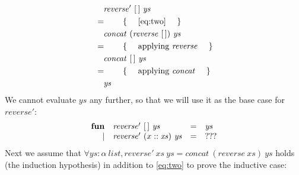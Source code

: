 \documentclass[10pt,a4paper,fleqn]{exam}
\begin{document}
\begin{questions}
\begin{parts}
\begin{align*}
\expr{\mathit{reverse}'~\hslist{}~\mathit{ys}}
\hint{\autoref{eq:two}}
\expr{\mathit{concat}~(\mathit{reverse}~\hslist{})~\mathit{ys}}
\hint{applying $\mathit{reverse}$}
\expr{\mathit{concat}~\hslist{}~\mathit{ys}}
\hint{applying $\mathit{concat}$}
\lastexpr{\mathit{ys}}
\end{align*}
We cannot evaluate $\mathit{ys}$ any further, so that we will use it as the base case for $\mathit{reverse}'$:
\begin{displaymath}
\begin{array}{rlcl}
\mathbf{fun} & \mathit{reverse}'~\hslist{}~\mathit{ys} & = & \mathit{ys} \\
    \mid & \mathit{reverse}'~(x :: \mathit{xs})~\mathit{ys} & = & ???
\end{array}
\end{displaymath}
Next we assume that $\forall ys : \alpha~\mathit{list}, \mathit{reverse}'~\mathit{xs}~\mathit{ys} = \mathit{concat}~(\mathit{reverse}~\mathit{xs})~\mathit{ys}$ holds (the induction hypothesis) in addition to \autoref{eq:two} to prove the inductive case:


\end{parts}
\end{questions}
\end{document}
